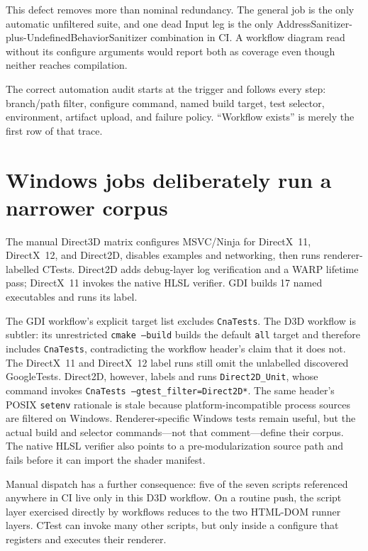 This defect removes more than nominal redundancy.  The general job is the only automatic
unfiltered suite, and one dead Input leg is the only AddressSanitizer-plus-UndefinedBehaviorSanitizer
combination in CI.  A workflow diagram read without its configure arguments would report both as
coverage even though neither reaches compilation.

The correct automation audit starts at the trigger and follows every step: branch/path filter,
configure command, named build target, test selector, environment, artifact upload, and failure
policy.  ``Workflow exists'' is merely the first row of that trace.

\section{Windows jobs deliberately run a narrower corpus}

The manual Direct3D matrix configures MSVC/Ninja for DirectX~11, DirectX~12, and Direct2D, disables
examples and networking, then runs renderer-labelled CTests.  Direct2D adds debug-layer log
verification and a WARP lifetime pass; DirectX~11 invokes the native HLSL verifier.  GDI builds 17
named executables and runs its label.

The GDI workflow's explicit target list excludes \texttt{CnaTests}.  The D3D workflow is subtler:
its unrestricted \texttt{cmake --build} builds the default \texttt{all} target and therefore
includes \texttt{CnaTests}, contradicting the workflow header's claim that it does not.  The
DirectX~11 and DirectX~12 label runs still omit the unlabelled discovered GoogleTests.  Direct2D,
however, labels and runs \texttt{Direct2D\_Unit}, whose command invokes
\texttt{CnaTests --gtest\_filter=Direct2D*}.  The same header's POSIX \texttt{setenv} rationale is
stale because platform-incompatible process sources are filtered on Windows.  Renderer-specific
Windows tests remain useful, but the actual build and selector commands---not that comment---define
their corpus.  The native HLSL verifier also points to a pre-modularization source path and fails
before it can import the shader manifest.

Manual dispatch has a further consequence: five of the seven scripts referenced anywhere in CI
live only in this D3D workflow.  On a routine push, the script layer exercised directly by
workflows reduces to the two HTML-DOM runner layers.  CTest can invoke many other scripts, but only
inside a configure that registers and executes their renderer.

